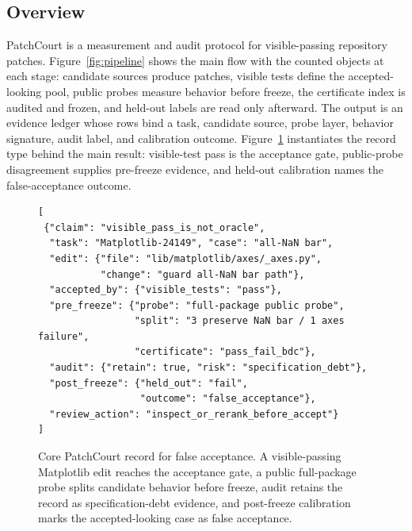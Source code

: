 \documentclass[conference]{IEEEtran}
\newcommand{\patchcourt}{PatchCourt\xspace}
\newcommand{\Description}[1]{}
\begin{document}
\subsection{Overview}

\patchcourt is a measurement and audit protocol for visible-passing repository patches.
Figure~\ref{fig:pipeline} shows the main flow with the counted objects at each stage: candidate sources produce patches, visible tests define the accepted-looking pool, public probes measure behavior before freeze, the certificate index is audited and frozen, and held-out labels are read only afterward.
The output is an evidence ledger whose rows bind a task, candidate source, probe layer, behavior signature, audit label, and calibration outcome.
Figure~\ref{fig:structured-patch-record} instantiates the record type behind the main result: visible-test pass is the acceptance gate, public-probe disagreement supplies pre-freeze evidence, and held-out calibration names the false-acceptance outcome.

\begin{figure}[t]
\begin{lstlisting}[style=patchcourtpatch]
[
 {"claim": "visible_pass_is_not_oracle",
  "task": "Matplotlib-24149", "case": "all-NaN bar",
  "edit": {"file": "lib/matplotlib/axes/_axes.py",
           "change": "guard all-NaN bar path"},
  "accepted_by": {"visible_tests": "pass"},
  "pre_freeze": {"probe": "full-package public probe",
                 "split": "3 preserve NaN bar / 1 axes failure",
                 "certificate": "pass_fail_bdc"},
  "audit": {"retain": true, "risk": "specification_debt"},
  "post_freeze": {"held_out": "fail",
                  "outcome": "false_acceptance"},
  "review_action": "inspect_or_rerank_before_accept"}
]
\end{lstlisting}
  \caption{Core PatchCourt record for false acceptance. A visible-passing Matplotlib edit reaches the acceptance gate, a public full-package probe splits candidate behavior before freeze, audit retains the record as specification-debt evidence, and post-freeze calibration marks the accepted-looking case as false acceptance.}
  \Description{JSON-like PatchCourt record for the Matplotlib all-NaN bar-plot case. It names the visible-pass-is-not-oracle claim, visible-test pass status, pre-freeze public-probe split, retained specification-debt audit label, post-freeze held-out failure, and the recommended inspect-or-rerank action.}
  \label{fig:structured-patch-record}
\end{figure}
\end{document}
